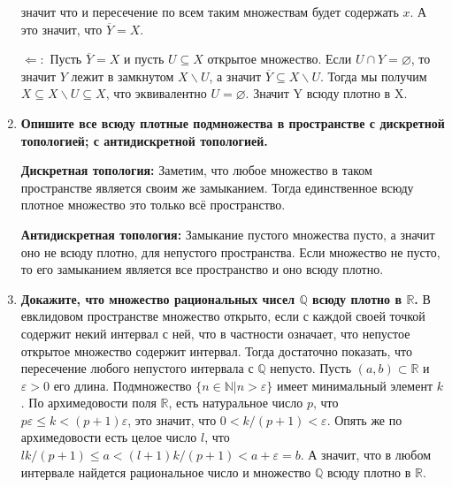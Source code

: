 \documentclass{article}
\begin{document}
\begin{enumerate}
        значит что и пересечение по всем таким множествам будет содержать $x$.
        А это значит, что $\overline{Y}=X$.\par
        $\Leftarrow:$ Пусть $\overline{Y}=X$ и пусть $U\subseteq X$ открытое
        множество. Если $U\cap Y=\varnothing$, то значит $Y$ лежит в замкнутом
        $X\backslash U$, а значит $\overline{Y} \subseteq X\backslash U$. Тогда
        мы получим $X\subseteq X\backslash U\subseteq X$, что эквивалентно
        $U=\varnothing$. Значит Y всюду плотно в X.
    \item \textbf{Опишите все всюду плотные подмножества в пространстве с
        дискретной топологией; с антидискретной топологией.}\par
        \textbf{Дискретная топология:} Заметим, что любое множество в таком
        пространстве является своим же замыканием. Тогда единственное всюду
        плотное множество это только всё пространство.\par
        \textbf{Антидискретная топология:} Замыкание пустого множества пусто, а
        значит оно не всюду плотно, для непустого пространства. Если множество
        не пусто, то его замыканием является все пространство и оно всюду плотно.
    \item \textbf{Докажите, что множество рациональных чисел $\mathbb{Q}$ всюду
        плотно в $\mathbb{R}$.} В евклидовом пространстве множество открыто,
        если с каждой своей точкой содержит некий интервал с ней, что в
        частности означает, что непустое открытое множество содержит интервал.
        Тогда достаточно показать, что пересечение любого непустого интервала с
        $\mathbb{Q}$ непусто. Пусть $(a, b)\subset\mathbb{R}$ и $\varepsilon>0$
        его длина. Подмножество $\{n\in\mathbb{N}|n>\varepsilon\}$ имеет
        минимальный элемент $k$. По архимедовости поля $\mathbb{R}$, есть
        натуральное число $p$, что $p\varepsilon \leqslant k < (p+1)
        \varepsilon$, это значит, что $0 < k/(p+1) < \varepsilon$. Опять же по
        архимедовости есть целое число $l$, что $lk/(p+1) \leqslant a <
        (l+1)k/(p+1) < a + \varepsilon = b$. А значит, что в любом интервале
        найдется рациональное число и множество $\mathbb{Q}$ всюду плотно в
        $\mathbb{R}$.
\end{enumerate}
\end{document}

